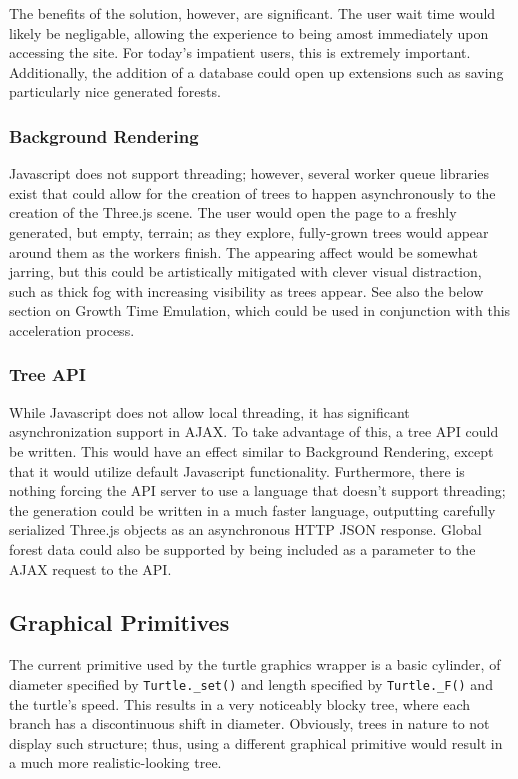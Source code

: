 \documentclass{article}
\newcommand{\tab}{\hspace*{2em}}
\begin{document}
    \tab The benefits of the solution, however, are significant. The user wait time would likely be
negligable, allowing the experience to being amost immediately upon accessing the site. For today's
impatient users, this is extremely important. Additionally, the addition of a database could open
up extensions such as saving particularly nice generated forests.

            \subsubsection{Background Rendering}
    \tab Javascript does not support threading; however, several worker queue libraries exist that
could allow for the creation of trees to happen asynchronously to the creation of the Three.js
scene. The user would open the page to a freshly generated, but empty, terrain; as they explore,
fully-grown trees would appear around them as the workers finish. The appearing affect would be
somewhat jarring, but this could be artistically mitigated with clever visual distraction, such as
thick fog with increasing visibility as trees appear. See also the below section on Growth Time
Emulation, which could be used in conjunction with this acceleration process.

            \subsubsection{Tree API}
    \tab While Javascript does not allow local threading, it has significant asynchronization
support in AJAX. To take advantage of this, a tree API could be written. This would have an effect
similar to Background Rendering, except that it would utilize default Javascript functionality.
Furthermore, there is nothing forcing the API server to use a language that doesn't support
threading; the generation could be written in a much faster language, outputting carefully
serialized Three.js objects as an asynchronous HTTP JSON response. Global forest data could also be
supported by being included as a parameter to the AJAX request to the API.

        \subsection{Graphical Primitives}
    \tab The current primitive used by the turtle graphics wrapper is a basic cylinder, of diameter
specified by \verb|Turtle._set()| and length specified by \verb|Turtle._F()| and the turtle's
speed. This results in a very noticeably blocky tree, where each branch has a discontinuous shift
in diameter. Obviously, trees in nature to not display such structure; thus, using a different
graphical primitive would result in a much more realistic-looking tree.
\end{document}
